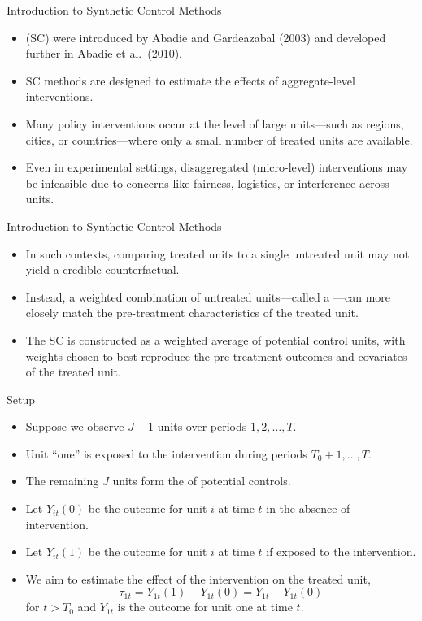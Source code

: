 \documentclass[11pt,aspectratio=169]{beamer}
\begin{document}
\begin{frame}{Introduction to Synthetic Control Methods}
\begin{itemize}
  \item {} (SC) were introduced by Abadie and Gardeazabal (2003) and developed further in Abadie et al.\ (2010).
  \item SC methods are designed to estimate the effects of aggregate-level interventions.
  \item Many policy interventions occur at the level of large units---such as regions, cities, or countries---where only a small number of treated units are available.
  \item Even in experimental settings, disaggregated (micro-level) interventions may be infeasible due to concerns like fairness, logistics, or interference across units.
\end{itemize}
\end{frame}

\begin{frame}{Introduction to Synthetic Control Methods}
\begin{itemize}
  \item In such contexts, comparing treated units to a single untreated unit may not yield a credible counterfactual.
  \item Instead, a weighted combination of untreated units---called a ---can more closely match the pre-treatment characteristics of the treated unit.
  \item The SC is constructed as a weighted average of potential control units, with weights chosen to best reproduce the pre-treatment outcomes and covariates of the treated unit.
\end{itemize}
\end{frame}

\begin{frame}{Setup}
\begin{itemize}
  \item Suppose we observe $J+1$ units over periods $1,2,\dots,T$.
  \item Unit ``one'' is exposed to the intervention during periods $T_0+1,\dots,T$.
  \item The remaining $J$ units form the  of potential controls.
  \item Let $Y_{it}(0)$ be the outcome for unit $i$ at time $t$ in the absence of intervention.
  \item Let $Y_{it}(1)$ be the outcome for unit $i$ at time $t$ if exposed to the intervention.
  \item We aim to estimate the effect of the intervention on the treated unit,
  \[\tau_{1t}=Y_{1t}(1)-Y_{1t}(0)=Y_{1t}-Y_{1t}(0)\]
  for $t>T_0$ and $Y_{1t}$ is the outcome for unit one at time $t$.
\end{itemize}
\end{frame}
\end{document}
